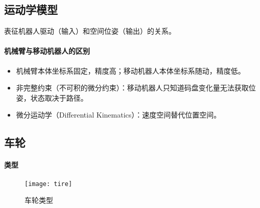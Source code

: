 \documentclass[
12pt, %
a4paper, 
oneside, %
headinclude,footinclude, %
]{scrartcl}
\begin{document}
\subsection[运动学模型]{运动学模型}
表征机器人驱动（输入）和空间位姿（输出）的关系。
\paragraph{机械臂与移动机器人的区别}
\begin{itemize}
\item 机械臂本体坐标系固定，精度高；移动机器人本体坐标系随动，精度低。
\item 非完整约束（不可积的微分约束）：移动机器人只知道码盘变化量无法获取位姿，状态取决于路径。
\item 微分运动学（Differential Kinematics）：速度空间替代位置空间。
\end{itemize}
\subsection[车轮]{车轮}
\paragraph{类型}
\begin{figure}[H]
\centering 
\texttt{[image: tire]} 
\caption{车轮类型}
\end{figure}
\end{document}
